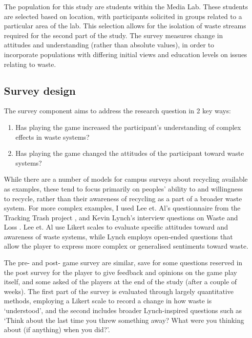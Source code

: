 \documentclass[nofonts,nols,justified,nobib]{tufte-book}
\begin{document}
The population for this study are students within the Media Lab. These students are selected based on location, with participants solicited in groups related to a particular area of the lab. This selection allows for the isolation of waste streams required for the second part of the study. The survey measures change in attitudes and understanding (rather than absolute values), in order to incorporate populations with differing initial views and education levels on issues relating to waste.

\subsection*{Survey design}

The survey component aims to address the research question in 2 key ways:

\begin{enumerate}
\item Has playing the game increased the participant's understanding of complex effects in waste systems?
\item Has playing the game changed the attitudes of the participant toward waste systems?
\end{enumerate}

While there are a number of models for campus surveys about recycling available as examples, these tend to focus primarily on peoples' ability to and willingness to recycle, rather than their awareness of recycling as a part of a broader waste system. For more complex examples, I used Lee et. Al's questionnaire from the Tracking Trash project \cite{lee_learning_2014}, and Kevin Lynch's interview questions on Waste and Loss \cite{lynch_wasting_1990}. Lee et. Al use Likert scales to evaluate specific attitudes toward and awareness of waste systems, while Lynch employs open-ended questions that allow the player to express more complex or generalised sentiments toward waste.


The pre- and post- game survey are similar, save for some questions reserved in the post survey for the player to give feedback and opinions on the game play itself, and some asked of the players at the end of the study (after a couple of weeks). The first part of the survey is evaluated through largely quantitative methods, employing a Likert scale to record a change in how waste is `understood', and the second includes broader Lynch-inspired questions such as `Think about the last time you threw something away? What were you thinking about (if anything) when you did?'. 
\end{document}
